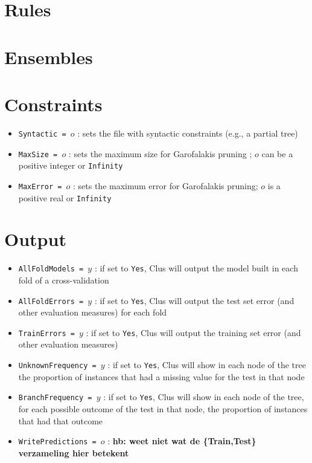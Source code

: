 \documentclass[a4paper]{report}
\begin{document}
\section{Rules}


\section{Ensembles}

\section{Constraints}

\begin{itemize}
\item {\tt Syntactic = $o$} : sets the file with syntactic constraints (e.g., a partial tree) \cite{paper-on-constraints}
\item {\tt MaxSize = $o$} : sets the maximum size for Garofalakis pruning \cite{Garofalakis}; $o$ can be a positive integer or {\tt Infinity}
\item {\tt MaxError = $o$} : sets the maximum error for Garofalakis pruning; $o$ is a positive real or {\tt Infinity}
\end{itemize}

\section{Output}

\begin{itemize}
\item {\tt AllFoldModels = $y$} : if set to {\tt Yes}, Clus will output the model built in each fold of a cross-validation
\item {\tt AllFoldErrors = $y$} : if set to {\tt Yes}, Clus will output the test set error (and other evaluation measures) for each fold
\item {\tt TrainErrors = $y$} : if set to {\tt Yes}, Clus will output the training set error (and other evaluation measures)
\item {\tt UnknownFrequency = $y$} : if set to {\tt Yes}, Clus will show in each node of the tree the proportion of instances that had a missing value for the test in that node
\item {\tt BranchFrequency = $y$} : if set to {\tt Yes}, Clus will show in each node of the tree, for each possible outcome of the test in that node, the proportion of instances that had that outcome
\item {\tt WritePredictions = $o$} : {\bf * hb: weet niet wat de \{Train,Test\} verzameling hier betekent}
\end{itemize}
\end{document}
